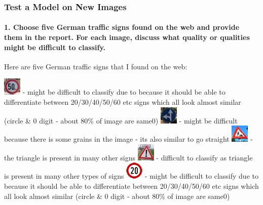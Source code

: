 \documentclass[11pt]{article}
\makeatletter
\def\maxwidth{\ifdim\Gin@nat@width>\linewidth\linewidth
    \else\Gin@nat@width\fi}
\let\Oldincludegraphics\includegraphics
\renewcommand{\includegraphics}[1]{\Oldincludegraphics[width=.8\maxwidth]{#1}}
\makeatother
\begin{document}
\subsubsection{Test a Model on New
Images}\label{test-a-model-on-new-images}

\paragraph{1. Choose five German traffic signs found on the web and
provide them in the report. For each image, discuss what quality or
qualities might be difficult to
classify.}\label{choose-five-german-traffic-signs-found-on-the-web-and-provide-them-in-the-report.-for-each-image-discuss-what-quality-or-qualities-might-be-difficult-to-classify.}

Here are five German traffic signs that I found on the web:

\includegraphics{./private/2-1.jpg} - might be difficult to classify due
to because it should be able to differentiate between 20/30/40/50/60 etc
signs which all look almost similar (circle \& 0 digit - about 80\% of
image are same0) \includegraphics{./private/37-1.jpg} - might be
difficult because there is some grains in the image - its also similar
to go straight \includegraphics{./private/25-1.jpg} - the triangle is
present in many other signs \includegraphics{./private/18-1.jpg} -
difficult to classify as triangle is present in many other types of
signs \includegraphics{./private/0-1.jpg} - might be difficult to
classify due to because it should be able to differentiate between
20/30/40/50/60 etc signs which all look almost similar (circle \& 0
digit - about 80\% of image are same0)
\end{document}
